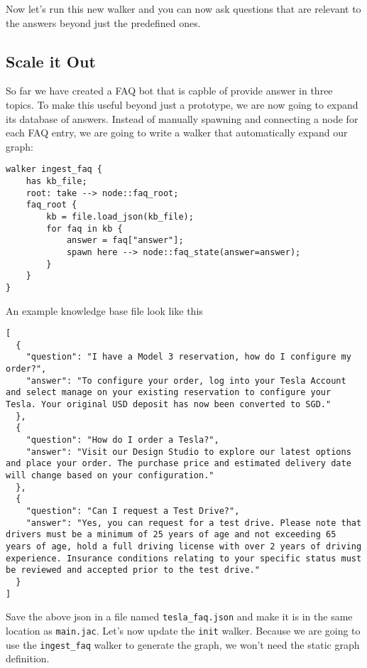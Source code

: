 Now let's run this new walker and you can now ask questions that are
relevant to the answers beyond just the predefined ones.

\subsection{Scale it Out}\label{scale-it-out}

So far we have created a FAQ bot that is capble of provide answer in
three topics. To make this useful beyond just a prototype, we are now
going to expand its database of answers. Instead of manually spawning
and connecting a node for each FAQ entry, we are going to write a walker
that automatically expand our graph:

\begin{lstlisting}
walker ingest_faq {
    has kb_file;
    root: take --> node::faq_root;
    faq_root {
        kb = file.load_json(kb_file);
        for faq in kb {
            answer = faq["answer"];
            spawn here --> node::faq_state(answer=answer);
        }
    }
}
\end{lstlisting}

An example knowledge base file look like this

\begin{lstlisting}
[
  {
    "question": "I have a Model 3 reservation, how do I configure my order?",
    "answer": "To configure your order, log into your Tesla Account and select manage on your existing reservation to configure your Tesla. Your original USD deposit has now been converted to SGD."
  },
  {
    "question": "How do I order a Tesla?",
    "answer": "Visit our Design Studio to explore our latest options and place your order. The purchase price and estimated delivery date will change based on your configuration."
  },
  {
    "question": "Can I request a Test Drive?",
    "answer": "Yes, you can request for a test drive. Please note that drivers must be a minimum of 25 years of age and not exceeding 65 years of age, hold a full driving license with over 2 years of driving experience. Insurance conditions relating to your specific status must be reviewed and accepted prior to the test drive."
  }
]
\end{lstlisting}

Save the above json in a file named \lstinline!tesla_faq.json! and make
it is in the same location as \lstinline!main.jac!. Let's now update the
\lstinline!init! walker. Because we are going to use the
\lstinline!ingest_faq! walker to generate the graph, we won't need the
static graph definition.

